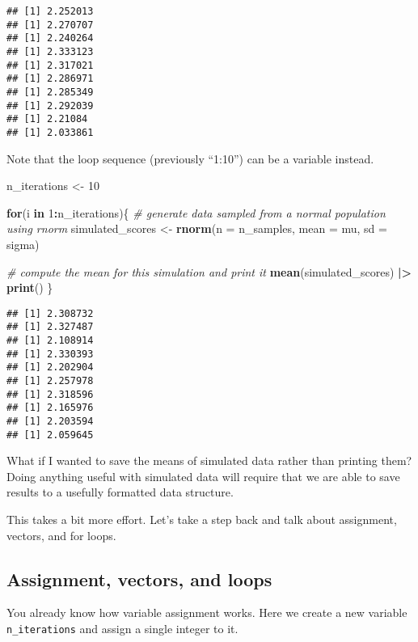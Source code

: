 \documentclass[
]{article}
\newenvironment{Shaded}{\begin{snugshade}}{\end{snugshade}}
\newcommand{\AttributeTok}[1]{\textcolor[rgb]{0.13,0.29,0.53}{#1}}
\newcommand{\CommentTok}[1]{\textcolor[rgb]{0.56,0.35,0.01}{\textit{#1}}}
\newcommand{\ControlFlowTok}[1]{\textcolor[rgb]{0.13,0.29,0.53}{\textbf{#1}}}
\newcommand{\DecValTok}[1]{\textcolor[rgb]{0.00,0.00,0.81}{#1}}
\newcommand{\FunctionTok}[1]{\textcolor[rgb]{0.13,0.29,0.53}{\textbf{#1}}}
\newcommand{\NormalTok}[1]{#1}
\newcommand{\OtherTok}[1]{\textcolor[rgb]{0.56,0.35,0.01}{#1}}
\newcommand{\SpecialCharTok}[1]{\textcolor[rgb]{0.81,0.36,0.00}{\textbf{#1}}}
\begin{document}
\begin{verbatim}
## [1] 2.252013
## [1] 2.270707
## [1] 2.240264
## [1] 2.333123
## [1] 2.317021
## [1] 2.286971
## [1] 2.285349
## [1] 2.292039
## [1] 2.21084
## [1] 2.033861
\end{verbatim}

Note that the loop sequence (previously ``1:10'') can be a variable
instead.

\begin{Shaded}
\begin{Highlighting}[]
\NormalTok{n\_iterations }\OtherTok{\textless{}{-}} \DecValTok{10} 

\ControlFlowTok{for}\NormalTok{(i }\ControlFlowTok{in} \DecValTok{1}\SpecialCharTok{:}\NormalTok{n\_iterations)\{}
  \CommentTok{\# generate data sampled from a normal population using rnorm}
\NormalTok{  simulated\_scores }\OtherTok{\textless{}{-}} 
    \FunctionTok{rnorm}\NormalTok{(}\AttributeTok{n =}\NormalTok{ n\_samples, }
          \AttributeTok{mean =}\NormalTok{ mu,}
          \AttributeTok{sd =}\NormalTok{ sigma)}
  
  \CommentTok{\# compute the mean for this simulation and print it}
  \FunctionTok{mean}\NormalTok{(simulated\_scores) }\SpecialCharTok{|\textgreater{}} 
    \FunctionTok{print}\NormalTok{()}
\NormalTok{\}}
\end{Highlighting}
\end{Shaded}

\begin{verbatim}
## [1] 2.308732
## [1] 2.327487
## [1] 2.108914
## [1] 2.330393
## [1] 2.202904
## [1] 2.257978
## [1] 2.318596
## [1] 2.165976
## [1] 2.203594
## [1] 2.059645
\end{verbatim}

What if I wanted to save the means of simulated data rather than
printing them? Doing anything useful with simulated data will require
that we are able to save results to a usefully formatted data structure.

This takes a bit more effort. Let's take a step back and talk about
assignment, vectors, and for loops.

\hypertarget{assignment-vectors-and-loops}{%
\subsection{Assignment, vectors, and
loops}\label{assignment-vectors-and-loops}}

You already know how variable assignment works. Here we create a new
variable \texttt{n\_iterations} and assign a single integer to it.
\end{document}
